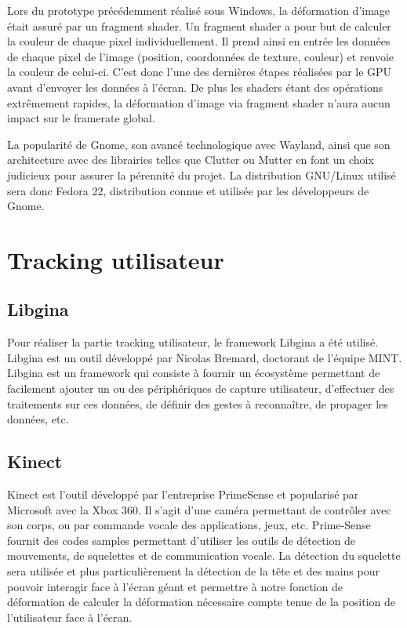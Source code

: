 Lors du prototype précédemment réalisé sous Windows, la déformation d'image était assuré par un fragment shader. Un fragment shader a pour but de calculer la couleur de chaque pixel individuellement. Il prend ainsi en entrée les données de chaque pixel de l'image (position, coordonnées de texture, couleur) et renvoie la couleur de celui-ci. C'est donc l'une des dernières étapes réalisées par le GPU avant d'envoyer les données à l'écran. De plus les shaders étant des opérations extrêmement rapides, la déformation d'image via fragment shader n'aura aucun impact sur le framerate global.

La popularité de Gnome, son avancé technologique avec Wayland, ainsi que son architecture avec des librairies telles que Clutter ou Mutter en font un choix judicieux pour assurer la pérennité du projet. La distribution GNU/Linux utilisé sera donc Fedora 22, distribution connue et utilisée par les développeurs de Gnome.




















\section{Tracking utilisateur}

\subsection{Libgina}

Pour réaliser la partie tracking utilisateur, le framework Libgina a été utilisé. Libgina est un outil développé par Nicolas Bremard, doctorant de l'équipe MINT. Libgina est un framework qui consiste à fournir un écosystème permettant de facilement ajouter un ou des périphériques de capture utilisateur, d'effectuer des traitements sur ces données, de définir des gestes à reconnaître, de propager les données, etc.

\subsection{Kinect}

Kinect est l’outil développé par l’entreprise PrimeSense et popularisé par Microsoft avec la Xbox 360. Il s’agit d’une caméra permettant de contrôler avec son corps, ou par commande vocale des applications, jeux, etc. Prime-Sense  fournit des codes samples permettant d’utiliser les outils de détection de mouvements, de squelettes et de communication vocale. La détection du squelette sera utilisée et plus particulièrement la détection de la tête et des mains pour pouvoir interagir face à l'écran géant et permettre à notre fonction de déformation de calculer la déformation nécessaire compte tenue de la position de l'utilisateur face à l'écran.


